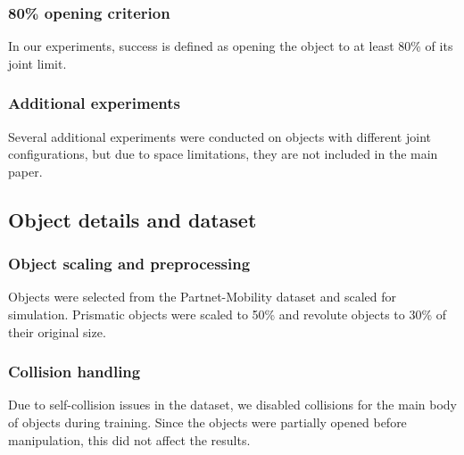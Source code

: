 \subsubsection{80\% opening criterion}
In our experiments, success is defined as opening the object to at least 80\% of its joint limit.

\subsubsection{Additional experiments}
Several additional experiments were conducted on objects with different joint configurations, but due to space limitations, they are not included in the main paper.

\subsection{Object details and dataset}

\subsubsection{Object scaling and preprocessing}
Objects were selected from the Partnet-Mobility dataset and scaled for simulation. Prismatic objects were scaled to 50\% and revolute objects to 30\% of their original size.

\subsubsection{Collision handling}
Due to self-collision issues in the dataset, we disabled collisions for the main body of objects during training. Since the objects were partially opened before manipulation, this did not affect the results.
